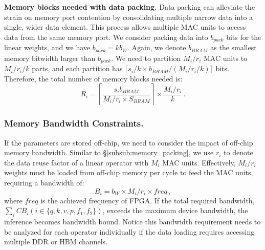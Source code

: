 \textbf{Memory blocks needed with data packing.}
Data packing can alleviate the strain on memory port contention by consolidating multiple narrow data into a single, wider data element.
This process allows multiple MAC units to access data from the same memory port.
We consider packing data into $b_{pack}$ bits for the linear weights, and we have $b_{pack}=kb_W$.
Again, we denote $b_{BRAM}$ as the smallest memory bitwidth larger than $b_{pack}$.
We need to partition $M_i/r_i$ MAC units to $M_i/r_i/k$ parts, and each partition has $\lceil s_i/k\times b_{BRAM}/(M_i/r_i/k)\rceil$ bits.
Therefore, the total number of memory blocks needed is:
\begin{equation}
\label{eq:port_packed_constraint}
R_i=\left\lceil \frac{s_ib_{BRAM}}{M_i/r_i\times S_{BRAM}} \right\rceil \times \frac{M_i/r_i}{k}\,.
\end{equation}



\subsubsection{Memory Bandwidth Constraints.}
\label{subsub:memory_bandwidth}
If the parameters are stored off-chip, we need to consider the impact of off-chip memory bandwidth.
Similar to \S\ref{subsub:memory_packing}, we use $r_i$ to denote the data reuse factor of a linear operator with $M_i$ MAC units.
Effectively, $M_i/r_i$ weights must be loaded from off-chip memory per cycle to feed the MAC units, requiring a bandwidth of:
\begin{equation}
\label{eq:bandwidth}
    B_i = b_W\times M_i/r_i \times freq\,,
\end{equation}
where $freq$ is the achieved frequency of FPGA.
If the total required bandwidth, $\sum_i C{B_i} (i \in \{q,k,v,p,f_1,f_2\})$, exceeds the maximum device bandwidth, the inference becomes bandwidth bound.
Notice this bandwidth requirement needs to be analyzed for each operator individually if the data loading requires accessing multiple DDR or HBM channels.